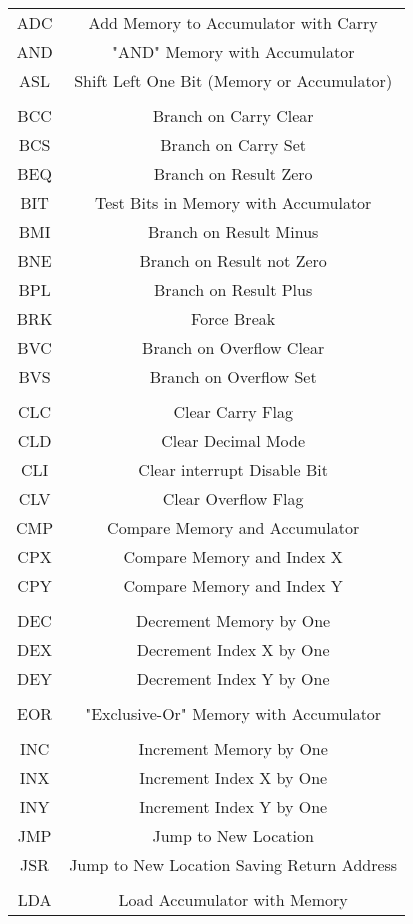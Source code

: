 \documentclass{article}
\begin{document}
\begin{longtable}{|c c|}
  ADC & Add Memory to Accumulator with Carry \\
  AND & "AND" Memory with Accumulator \\
  ASL & Shift Left One Bit (Memory or Accumulator) \\
      & \\
  BCC & Branch on Carry Clear \\
  BCS & Branch on Carry Set \\
  BEQ & Branch on Result Zero \\
  BIT & Test Bits in Memory with Accumulator \\
  BMI & Branch on Result Minus \\
  BNE & Branch on Result not Zero \\
  BPL & Branch on Result Plus \\
  BRK & Force Break \\
  BVC & Branch on Overflow Clear \\
  BVS & Branch on Overflow Set \\
      & \\
  CLC & Clear Carry Flag \\
  CLD & Clear Decimal Mode \\
  CLI & Clear interrupt Disable Bit \\
  CLV & Clear Overflow Flag \\
  CMP & Compare Memory and Accumulator \\
  CPX & Compare Memory and Index X \\
  CPY & Compare Memory and Index Y \\
      & \\
  DEC & Decrement Memory by One \\
  DEX & Decrement Index X by One \\
  DEY & Decrement Index Y by One \\
      & \\
  EOR & "Exclusive-Or" Memory with Accumulator \\
      & \\
  INC & Increment Memory by One \\
  INX & Increment Index X by One \\
  INY & Increment Index Y by One \\
  JMP & Jump to New Location \\
  JSR & Jump to New Location Saving Return Address \\
      & \\
  LDA & Load Accumulator with Memory \\

\end{longtable}
\end{document}
